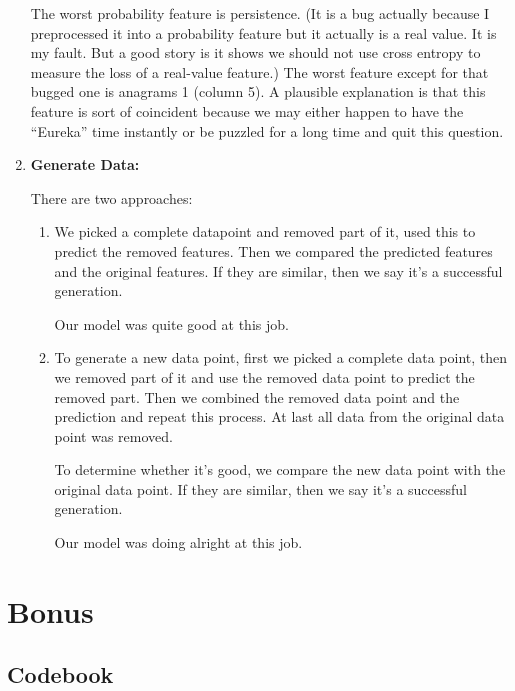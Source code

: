 \documentclass[11pt, a4paper]{article}
\begin{document}
\begin{enumerate}
	\par{The worst probability feature is persistence. (It is a bug actually because I preprocessed it into a probability feature but it actually is a real value. It is my fault. But a good story is it shows we should not use cross entropy to measure the loss of a real-value feature.) The worst feature except for that bugged one is anagrams 1 (column 5). A plausible explanation is that this feature is sort of coincident because we may either happen to have the ``Eureka'' time instantly or be puzzled for a long time and quit this question.}
	
	\item {\textbf{Generate Data:}}
	\par{There are two approaches:}
	\begin{enumerate}
		\item {}
		\par{We picked a complete datapoint and removed part of it, used this to predict the removed features. Then we compared the predicted features and the original features. If they are similar, then we say it's a successful generation. }
		\par{Our model was quite good at this job.}
		\item {}
		\par{To generate a new data point, first we picked a complete data point, then we removed part of it and use the removed data point to predict the removed part. Then we combined the removed data point and the prediction and repeat this process. At last all data from the original data point was removed. }
		\par{To determine whether it's good, we compare the new data point with the original data point. If they are similar, then we say it's a successful generation.}
		\par{Our model was doing alright at this job.}
	\end{enumerate}
\end{enumerate}


\section{Bonus}
\label{sec:Bonus}

\begin{appendices}
	\section{Codebook}
	\label{appendix:codebook}
	
\end{appendices}
\end{document}
